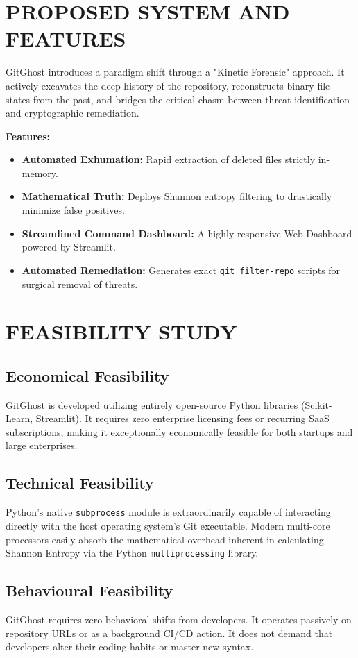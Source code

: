\documentclass[12pt, a4paper, oneside]{report}
\begin{document}
\section{PROPOSED SYSTEM AND FEATURES}
GitGhost introduces a paradigm shift through a "Kinetic Forensic" approach. It actively excavates the deep history of the repository, reconstructs binary file states from the past, and bridges the critical chasm between threat identification and cryptographic remediation.

\textbf{Features:}
\begin{itemize}
    \item \textbf{Automated Exhumation:} Rapid extraction of deleted files strictly in-memory.
    \item \textbf{Mathematical Truth:} Deploys Shannon entropy filtering to drastically minimize false positives.
    \item \textbf{Streamlined Command Dashboard:} A highly responsive Web Dashboard powered by Streamlit.
    \item \textbf{Automated Remediation:} Generates exact \texttt{git filter-repo} scripts for surgical removal of threats.
\end{itemize}

\section{FEASIBILITY STUDY}

\subsection{Economical Feasibility}
GitGhost is developed utilizing entirely open-source Python libraries (Scikit-Learn, Streamlit). It requires zero enterprise licensing fees or recurring SaaS subscriptions, making it exceptionally economically feasible for both startups and large enterprises.

\subsection{Technical Feasibility}
Python's native \texttt{subprocess} module is extraordinarily capable of interacting directly with the host operating system's Git executable. Modern multi-core processors easily absorb the mathematical overhead inherent in calculating Shannon Entropy via the Python \texttt{multiprocessing} library.

\subsection{Behavioural Feasibility}
GitGhost requires zero behavioral shifts from developers. It operates passively on repository URLs or as a background CI/CD action. It does not demand that developers alter their coding habits or master new syntax.
\end{document}
